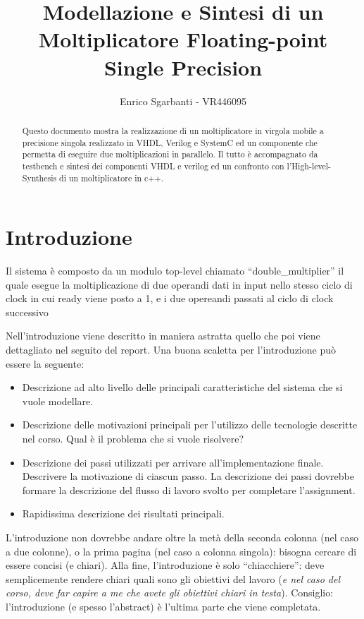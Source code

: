 \documentclass[]{IEEEtran}
\title{Modellazione e Sintesi di un Moltiplicatore Floating-point Single Precision}
\author{Enrico Sgarbanti - VR446095}
\begin{document}
\maketitle


\begin{abstract}
    Questo documento mostra la realizzazione di un moltiplicatore in virgola mobile a precisione singola realizzato in VHDL, Verilog e SystemC ed un componente che permetta di eseguire due moltiplicazioni in parallelo. Il tutto è accompagnato da testbench e sintesi dei componenti VHDL e verilog ed un confronto con l'High-level-Synthesis di un moltiplicatore in c++.
\end{abstract}


\section{Introduzione}
Il sistema è composto da un modulo top-level chiamato ``double\_multiplier'' il quale esegue la moltiplicazione di due operandi dati in input nello stesso ciclo di clock in cui ready viene posto a 1, e i due opereandi passati al ciclo di clock successivo

Nell'introduzione viene descritto in maniera astratta quello che poi viene dettagliato nel seguito del report. Una buona scaletta per l'introduzione può essere la seguente:
\begin{itemize}
    \item Descrizione ad alto livello delle principali caratteristiche del sistema che si vuole modellare.
    \item Descrizione delle motivazioni principali per l'utilizzo delle tecnologie descritte nel corso. Qual è il problema che si vuole risolvere?
    \item Descrizione dei passi utilizzati per arrivare all'implementazione finale. Descrivere la motivazione di ciascun passo. La descrizione dei passi dovrebbe formare la descrizione del flusso di lavoro svolto per completare l'assignment.
    \item Rapidissima descrizione dei risultati principali.
\end{itemize}

L'introduzione non dovrebbe andare oltre la metà della seconda colonna (nel caso a due colonne), o la prima pagina (nel caso a colonna singola): bisogna cercare di essere concisi (e chiari). Alla fine, l'introduzione è solo ``chiacchiere'': deve semplicemente rendere chiari quali sono gli obiettivi del lavoro (\emph{e nel caso del corso, deve far capire a me che avete gli obiettivi chiari in testa}). Consiglio: l'introduzione (e spesso l'abstract) è l'ultima parte che viene completata.
\end{document}
